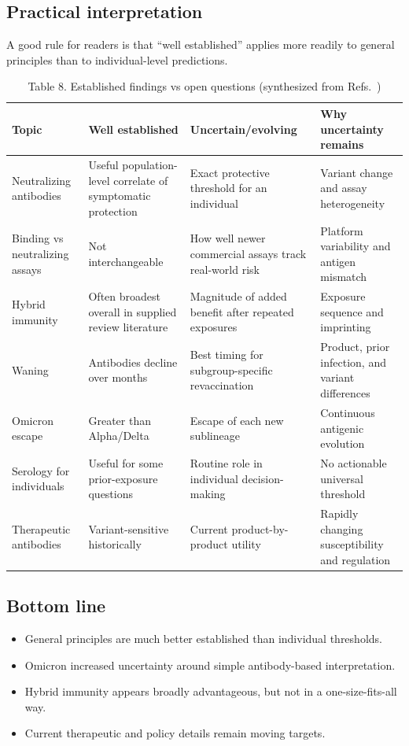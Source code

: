 \documentclass[12pt]{article}
\begin{document}
\subsection*{Practical interpretation}
A good rule for readers is that ``well established'' applies more readily to general principles than to individual-level predictions.

\begin{table}[H]
\centering
\caption{Table 8. Established findings vs open questions (synthesized from Refs.~\cite{ref1,ref3,ref5,ref8,ref9,ref12})}
\begin{tabularx}{\textwidth}{>{\raggedright\arraybackslash}p{2.4cm} >{\raggedright\arraybackslash}X >{\raggedright\arraybackslash}X >{\raggedright\arraybackslash}p{2.5cm}}
\toprule
Topic & Well established & Uncertain/evolving & Why uncertainty remains \\
\midrule
Neutralizing antibodies & Useful population-level correlate of symptomatic protection & Exact protective threshold for an individual & Variant change and assay heterogeneity \\
Binding vs neutralizing assays & Not interchangeable & How well newer commercial assays track real-world risk & Platform variability and antigen mismatch \\
Hybrid immunity & Often broadest overall in supplied review literature & Magnitude of added benefit after repeated exposures & Exposure sequence and imprinting \\
Waning & Antibodies decline over months & Best timing for subgroup-specific revaccination & Product, prior infection, and variant differences \\
Omicron escape & Greater than Alpha/Delta & Escape of each new sublineage & Continuous antigenic evolution \\
Serology for individuals & Useful for some prior-exposure questions & Routine role in individual decision-making & No actionable universal threshold \\
Therapeutic antibodies & Variant-sensitive historically & Current product-by-product utility & Rapidly changing susceptibility and regulation \\
\bottomrule
\end{tabularx}
\end{table}

\subsection*{Bottom line}
\begin{itemize}[leftmargin=1.5em]
    \item General principles are much better established than individual thresholds.
    \item Omicron increased uncertainty around simple antibody-based interpretation.
    \item Hybrid immunity appears broadly advantageous, but not in a one-size-fits-all way.
    \item Current therapeutic and policy details remain moving targets.
\end{itemize}
\end{document}
